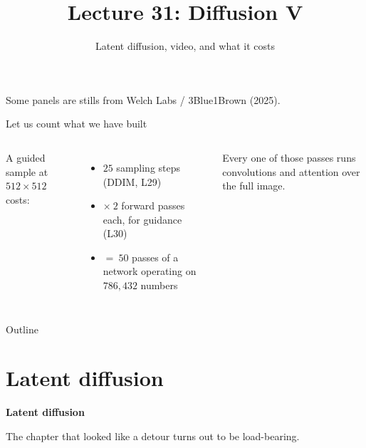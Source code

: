\documentclass[aspectratio=169]{beamer}
\title{Lecture 31: Diffusion V}
\subtitle{Latent diffusion, video, and what it costs}
\date{}
\begin{document}
\begin{frame}
  \titlepage
  \begin{center}\scriptsize\color{gray}
    Some panels are stills from Welch Labs / 3Blue1Brown (2025).
  \end{center}
\end{frame}

\begin{frame}{Let us count what we have built}
  \small
  \begin{columns}[T]
    A guided sample at $512\times512$ costs:
    \vskip 4pt
    \begin{itemize}\setlength\itemsep{2pt}
      \item $25$ sampling steps (DDIM, L29)
      \item $\times\ 2$ forward passes each, for guidance (L30)
      \item $=\ 50$ passes of a network operating on $786{,}432$ numbers
    \end{itemize}
    \vskip 6pt
    Every one of those passes runs convolutions and attention over the full image.
    \vskip 6pt
  \end{columns}
\end{frame}

\begin{frame}{Outline}
  \tableofcontents
\end{frame}

\section{Latent diffusion}

\begin{frame}[plain]
  \vfill
  \begin{center}
    {\Large\color{popblue}\textbf{Latent diffusion}}\\[0.9em]
    \begin{minipage}{0.82\textwidth}\centering\small
      The chapter that looked like a detour turns out to be load-bearing.
    \end{minipage}
  \end{center}
  \vfill
\end{frame}
\end{document}
